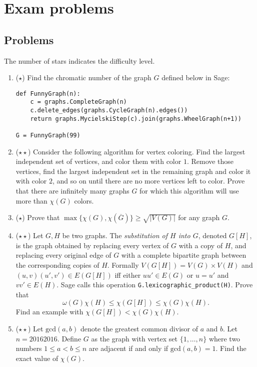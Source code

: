 \chapter{Exam problems}

\section{Problems}

The number of stars indicates the difficulty level.

\begin{enumerate}

\item ($\star$) Find the chromatic number of the graph $G$ defined below in Sage:
\begin{verbatim}
def FunnyGraph(n):
    c = graphs.CompleteGraph(n)
    c.delete_edges(graphs.CycleGraph(n).edges())
    return graphs.MycielskiStep(c).join(graphs.WheelGraph(n+1))

G = FunnyGraph(99)
\end{verbatim}


\item ($\star\star$) Consider the following algorithm for vertex coloring. Find the largest independent set of vertices, and color them with color $1$. Remove those vertices, find the largest independent set in the remaining graph and color it with color $2$, and so on until there are no more vertices left to color. Prove that there are infinitely many graphs $G$ for which this algorithm will use more than $\chi(G)$ colors.


\item ($\star$) Prove that $\max\{\chi(G),\chi(\overline{G})\}\geq \sqrt{|V(G)|}$ for any graph $G$.


\item ($\star\star$) Let $G, H$ be two graphs. The \emph{substitution of $H$ into $G$}, denoted $G[H]$, is the graph obtained by replacing every vertex of $G$ with a copy of $H$, and replacing every original edge of $G$ with a complete bipartite graph between the corresponding copies of $H$. Formally $V(G[H])=V(G)\times V(H)$ and $(u,v)(u',v')\in E(G[H])$ iff either $uu'\in E(G)$ or $u=u'$ and $vv'\in E(H)$. Sage calls this operation \texttt{G.lexicographic\_product(H)}. Prove that
$$\omega(G)\chi(H)\leq \chi(G[H])\leq \chi(G)\chi(H).$$
Find an example with $\chi(G[H])<\chi(G)\chi(H)$.


\item ($\star\star$) Let $\textrm{gcd}(a,b)$ denote the greatest common divisor of $a$ and $b$. Let $n=20162016$. Define $G$ as the graph with vertex set $\{1,\ldots,n\}$ where two numbers $1\leq a<b\leq n$ are adjacent if and only if $\textrm{gcd}(a,b)=1$. Find the exact value of $\chi(G)$.



\end{enumerate}
